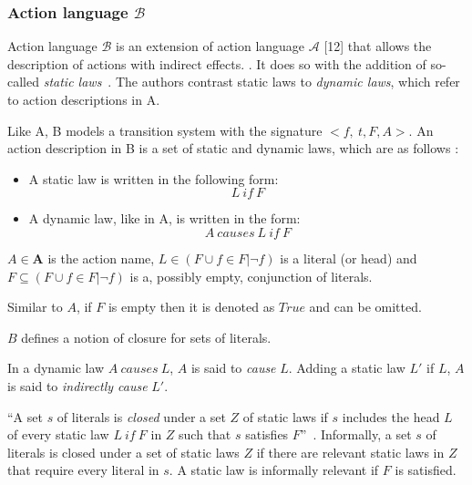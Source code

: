 \subsubsection{Action language $ \mathcal{B} $}
\label{subsubsec:action_language_b}

Action language $ \mathcal{B} $ is an extension of action language $ \mathcal{A} $ [12] that allows the description of actions with indirect effects.
\cite{gelfond_action_1998}.
It does so with the addition of so-called \textit{static laws}~\cite{gelfond_action_1998}.
The authors contrast static laws to \textit{dynamic laws}, which refer to action descriptions in A.

Like A, B models a transition system with the signature $<{f,\ t},F,A>$.
An action description in B is a set of static and dynamic laws, which are as follows \cite{gelfond_action_1998}:

\begin{itemize}
    \item A static law is written in the following form:
        $$
        L\ if\ F
        $$

    \item A dynamic law, like in A, is written in the form:
        $$
        A\ causes\ L\ if\ F
        $$
\end{itemize}

$A \in \boldsymbol{A}$ is the action name, $L \in(F \cup{f \in F| \neg f})$ is a literal (or head) and $F \subseteq(F \cup{f \in F| \neg f})$ is a, possibly empty, conjunction of literals.

Similar to $A$, if $F$ is empty then it is denoted as $True$ and can be omitted.

$B$ defines a notion of closure for sets of literals.

\begin{definition}
    In a dynamic law $A \ causes \ L$, $A$ is said to \textit{cause} $L$.
    Adding a static law $L'$ if $L$, $A$ is said to \textit{indirectly cause} $L'$.
\end{definition}

\begin{definition}
    ``A set $s$ of literals is \textit{closed} under a set $Z$ of static laws if $s$ includes the head $L$ of every static law $L\ if\ F$ in $Z$ such that $s$ satisfies $F$''~\cite{gelfond_action_1998}.
    Informally, a set $s$ of literals is closed under a set of static laws $Z$ if there are relevant static laws in $Z$ that require every literal in $s$.
    A static law is informally relevant if $F$ is satisfied.
\end{definition}


